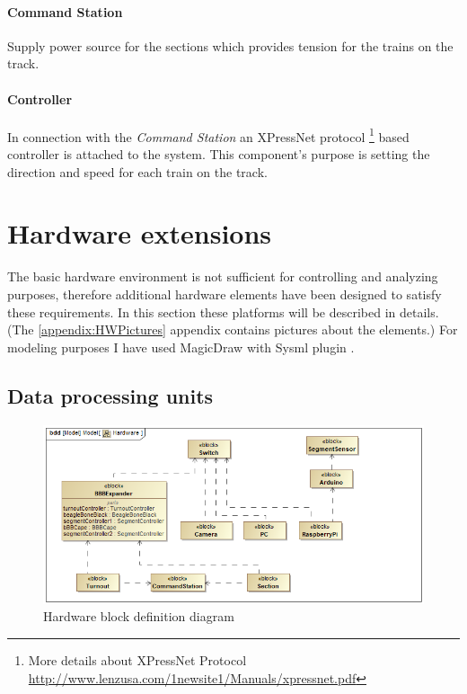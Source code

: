 \paragraph{Command Station}
Supply power source for the sections which provides tension for the trains on the track.

\paragraph{Controller}
In connection with the \textit{Command Station} an XPressNet protocol \footnote{More details about XPressNet Protocol \url{http://www.lenzusa.com/1newsite1/Manuals/xpressnet.pdf}} based controller is attached to the system. This component's purpose is setting the direction and speed for each train on the track.

\section{Hardware extensions}
The basic hardware environment is not sufficient for controlling and analyzing purposes, therefore additional hardware elements have been designed to satisfy these requirements. In this section these platforms will be described in details. (The \ref{appendix:HWPictures} appendix contains pictures about the elements.)
For modeling purposes I have used MagicDraw with Sysml plugin \cite{SysML}.

\subsection{Data processing units}
\begin{figure}[h]
	\centering
	\includegraphics[width=150mm]{figures/modes3/Hardware.png}
	\caption{Hardware block definition diagram}
	\label{fig:Modes3HWBDD}
\end{figure}

